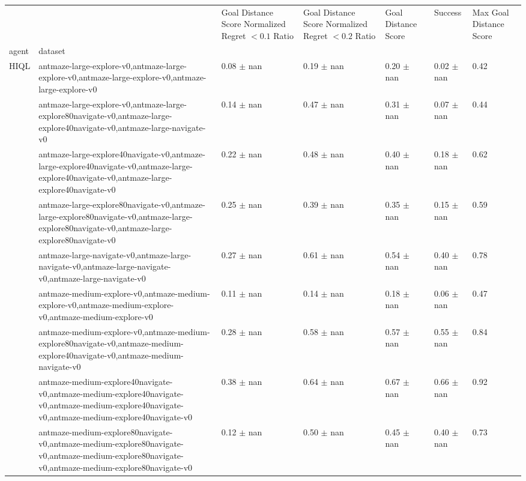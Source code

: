 \begin{tabular}{lllllll}
\toprule
 &  & Goal Distance Score Normalized Regret $< 0.1$ Ratio & Goal Distance Score Normalized Regret $< 0.2$ Ratio & Goal Distance Score & Success & Max Goal Distance Score \\
agent & dataset &  &  &  &  &  \\
\midrule
\multirow[t]{10}{*}{HIQL} & antmaze-large-explore-v0,antmaze-large-explore-v0,antmaze-large-explore-v0,antmaze-large-explore-v0 & 0.08 $\pm$ nan & 0.19 $\pm$ nan & 0.20 $\pm$ nan & 0.02 $\pm$ nan & 0.42 \\
 & antmaze-large-explore-v0,antmaze-large-explore80navigate-v0,antmaze-large-explore40navigate-v0,antmaze-large-navigate-v0 & 0.14 $\pm$ nan & 0.47 $\pm$ nan & 0.31 $\pm$ nan & 0.07 $\pm$ nan & 0.44 \\
 & antmaze-large-explore40navigate-v0,antmaze-large-explore40navigate-v0,antmaze-large-explore40navigate-v0,antmaze-large-explore40navigate-v0 & 0.22 $\pm$ nan & 0.48 $\pm$ nan & 0.40 $\pm$ nan & 0.18 $\pm$ nan & 0.62 \\
 & antmaze-large-explore80navigate-v0,antmaze-large-explore80navigate-v0,antmaze-large-explore80navigate-v0,antmaze-large-explore80navigate-v0 & 0.25 $\pm$ nan & 0.39 $\pm$ nan & 0.35 $\pm$ nan & 0.15 $\pm$ nan & 0.59 \\
 & antmaze-large-navigate-v0,antmaze-large-navigate-v0,antmaze-large-navigate-v0,antmaze-large-navigate-v0 & 0.27 $\pm$ nan & 0.61 $\pm$ nan & 0.54 $\pm$ nan & 0.40 $\pm$ nan & 0.78 \\
 & antmaze-medium-explore-v0,antmaze-medium-explore-v0,antmaze-medium-explore-v0,antmaze-medium-explore-v0 & 0.11 $\pm$ nan & 0.14 $\pm$ nan & 0.18 $\pm$ nan & 0.06 $\pm$ nan & 0.47 \\
 & antmaze-medium-explore-v0,antmaze-medium-explore80navigate-v0,antmaze-medium-explore40navigate-v0,antmaze-medium-navigate-v0 & 0.28 $\pm$ nan & 0.58 $\pm$ nan & 0.57 $\pm$ nan & 0.55 $\pm$ nan & 0.84 \\
 & antmaze-medium-explore40navigate-v0,antmaze-medium-explore40navigate-v0,antmaze-medium-explore40navigate-v0,antmaze-medium-explore40navigate-v0 & 0.38 $\pm$ nan & 0.64 $\pm$ nan & 0.67 $\pm$ nan & 0.66 $\pm$ nan & 0.92 \\
 & antmaze-medium-explore80navigate-v0,antmaze-medium-explore80navigate-v0,antmaze-medium-explore80navigate-v0,antmaze-medium-explore80navigate-v0 & 0.12 $\pm$ nan & 0.50 $\pm$ nan & 0.45 $\pm$ nan & 0.40 $\pm$ nan & 0.73 \\

\end{tabular}
